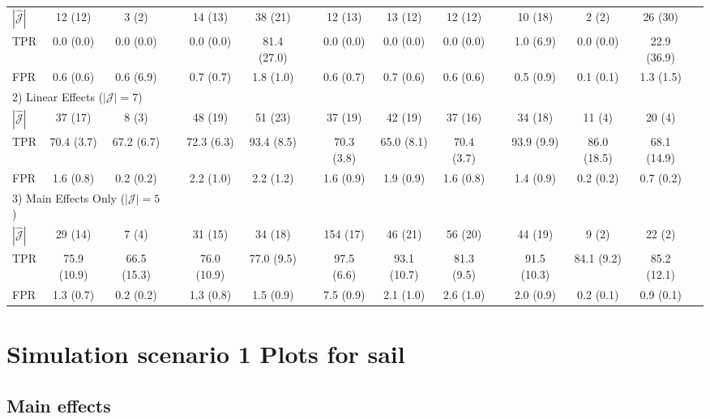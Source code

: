 \documentclass[12pt,letter]{article}\usepackage[]{graphicx}\usepackage[]{color}
\newcommand{\mcl}[2]{\multicolumn{#1}{l}{#2}}
\begin{document}
\begin{table}
\begin{tabular}{lcccccccccccccc}
$|\widehat{\mathcal{J}}|$ & 12 (12) & 3 (2)  & & 14 (13) & 38 (21)  & & 12 (13) & 13 (12) & 12 (12)  & & 10 (18) & 2 (2) & 26 (30) \\
TPR & 0.0 (0.0) & 0.0 (0.0)  & & 0.0 (0.0) & 81.4 (27.0)  & & 0.0 (0.0) & 0.0 (0.0) & 0.0 (0.0)  & & 1.0 (6.9) & 0.0 (0.0) & 22.9 (36.9) \\
FPR & 0.6 (0.6) & 0.6 (6.9)  & & 0.7 (0.7) & 1.8 (1.0)  & & 0.6 (0.7) & 0.7 (0.6) & 0.6 (0.6)  & & 0.5 (0.9) & 0.1 (0.1) & 1.3 (1.5) \\
\hline
\mcl{3}{2) Linear Effects ($|\mathcal{J}|=7$)}\\
$|\widehat{\mathcal{J}}|$ & 37 (17) & 8 (3)  & & 48 (19) & 51 (23)  & & 37 (19) & 42 (19) & 37 (16)  & & 34 (18) & 11 (4) & 20 (4) \\
TPR & 70.4 (3.7) & 67.2 (6.7)  & & 72.3 (6.3) & 93.4 (8.5) &  & 70.3 (3.8) & 65.0 (8.1) & 70.4 (3.7)  & & 93.9 (9.9) & 86.0 (18.5) & 68.1 (14.9) \\
FPR & 1.6 (0.8) & 0.2 (0.2)  & & 2.2 (1.0) & 2.2 (1.2)  & & 1.6 (0.9) & 1.9 (0.9) & 1.6 (0.8)  & & 1.4 (0.9) & 0.2 (0.2) & 0.7 (0.2) \\
\hline
\mcl{3}{3) Main Effects Only ($|\mathcal{J}|=5$)}\\
$|\widehat{\mathcal{J}}|$ & 29 (14) & 7 (4)  & & 31 (15) & 34 (18)  & & 154 (17) & 46 (21) & 56 (20) & &  44 (19) & 9 (2) & 22 (2) \\
TPR & 75.9 (10.9) & 66.5 (15.3) & &  76.0 (10.9) & 77.0 (9.5)  & & 97.5 (6.6) & 93.1 (10.7) & 81.3 (9.5) & &  91.5 (10.3) & 84.1 (9.2) & 85.2 (12.1) \\
FPR & 1.3 (0.7) & 0.2 (0.2) & &  1.3 (0.8) & 1.5 (0.9)  & & 7.5 (0.9) & 2.1 (1.0) & 2.6 (1.0)  & & 2.0 (0.9) & 0.2 (0.1) & 0.9 (0.1) \\
\hline
	\end{tabular}
\end{table}





\section{Simulation scenario 1 Plots for sail}


\subsection{Main effects}
\end{document}
